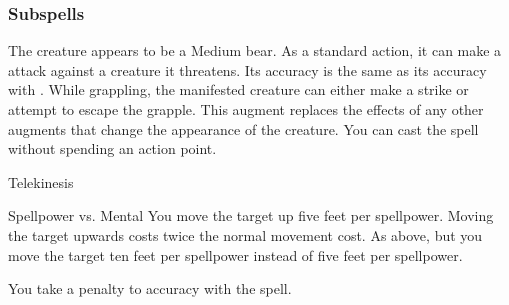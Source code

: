 \subsubsection{Subspells}
The creature appears to be a Medium bear.
As a standard action, it can make a  attack against a creature it threatens.
Its accuracy is the same as its accuracy with .
While grappling, the manifested creature can either make a strike or attempt to escape the grapple.
This augment replaces the effects of any other augments that change the appearance of the creature.
You can cast the spell without spending an action point.
\begin{spellsection}{Telekinesis}
\begin{spellcontent}
\begin{spelltargetinginfo}
\end{spelltargetinginfo}
\begin{spelleffects}
\begin{spellattack}{Spellpower vs. Mental}
\spellsuccess
You move the target up five feet per spellpower. Moving the target upwards costs twice the normal movement cost.
\spellcritical
As above, but you move the target ten feet per spellpower instead of five feet per spellpower.
\end{spellattack}
\end{spelleffects}
\end{spellcontent}
\begin{spellfooter}
\end{spellfooter}
\begin{spellsubcontent}
\begin{spellcantrip}
You take a  penalty to accuracy with the spell.
\end{spellcantrip}
\end{spellsubcontent}
\end{spellsection}
